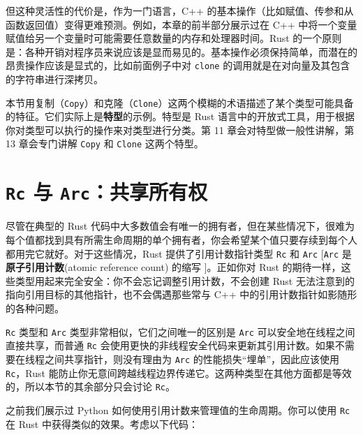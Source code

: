 但这种灵活性的代价是，作为一门语言，C++ 的基本操作（比如赋值、传参和从函数返回值）变得更难预测。例如，本章的前半部分展示过在 C++ 中将一个变量赋值给另一个变量时可能需要任意数量的内存和处理器时间。Rust 的一个原则是：各种开销对程序员来说应该是显而易见的。基本操作必须保持简单，而潜在的昂贵操作应该是显式的，比如前面例子中对 \texttt{clone} 的调用就是在对向量及其包含的字符串进行深拷贝。

本节用复制（\texttt{Copy}）和克隆（\texttt{Clone}）这两个模糊的术语描述了某个类型可能具备的特征。它们实际上是\textbf{特型}的示例。特型是 Rust 语言中的开放式工具，用于根据你对类型可以执行的操作来对类型进行分类。第 11 章会对特型做一般性讲解，第 13 章会专门讲解 \texttt{Copy} 和 \texttt{Clone} 这两个特型。

\section{\texttt{Rc} 与 \texttt{Arc}：共享所有权}

尽管在典型的 Rust 代码中大多数值会有唯一的拥有者，但在某些情况下，很难为每个值都找到具有所需生命周期的单个拥有者，你会希望某个值只要存续到每个人都用完它就好。对于这些情况，Rust 提供了引用计数指针类型 \texttt{Rc} 和 \texttt{Arc} [\texttt{Arc} 是\textbf{原子引用计数}(atomic reference count) 的缩写 ]。正如你对 Rust 的期待一样，这些类型用起来完全安全：你不会忘记调整引用计数，不会创建 Rust 无法注意到的指向引用目标的其他指针，也不会偶遇那些常与 C++ 中的引用计数指针如影随形的各种问题。

\texttt{Rc} 类型和 \texttt{Arc} 类型非常相似，它们之间唯一的区别是 \texttt{Arc} 可以安全地在线程之间直接共享，而普通 \texttt{Rc} 会使用更快的非线程安全代码来更新其引用计数。如果不需要在线程之间共享指针，则没有理由为 \texttt{Arc} 的性能损失“埋单”，因此应该使用 \texttt{Rc}，Rust 能防止你无意间跨越线程边界传递它。这两种类型在其他方面都是等效的，所以本节的其余部分只会讨论 \texttt{Rc}。

之前我们展示过 Python 如何使用引用计数来管理值的生命周期。你可以使用 \texttt{Rc} 在 Rust 中获得类似的效果。考虑以下代码：

